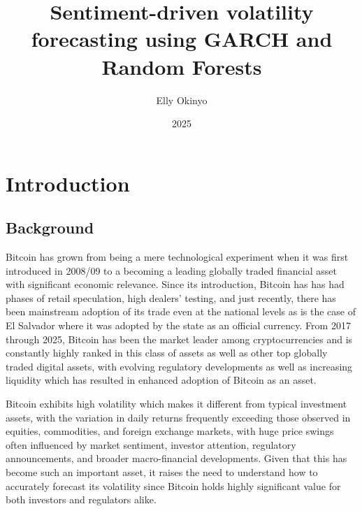\documentclass[12pt]{report}
\begin{document}
\Centering
\justifying

\title{Sentiment-driven volatility forecasting using GARCH and Random Forests}
\author{Elly Okinyo}
\date{2025}
\maketitle
\clearpage
{}    %
\setcounter{page}{1}     %
\tableofcontents
\newpage
\clearpage
{}   %
\setcounter{page}{1}     %
\chapter{Introduction}

\section{Background}

Bitcoin has grown from being a mere technological experiment when it was first introduced in 2008/09 to a becoming a leading globally traded financial asset with significant economic relevance. Since its introduction, Bitcoin has has had phases of retail speculation, high dealers' testing, and just recently, there has been mainstream adoption of its trade even at the national levels as is the case of El Salvador where it was adopted by the state as an official currency\citep{ArgenteVanPatten2024Bitcoin}. From 2017 through 2025, Bitcoin has been the market leader among cryptocurrencies and is constantly highly ranked in this class of assets as well as other top globally traded digital assets, with evolving regulatory developments as well as increasing liquidity which has resulted in enhanced adoption of Bitcoin as an asset.

Bitcoin exhibits high volatility which makes it different from typical investment assets, with the variation in daily returns frequently exceeding those observed in equities, commodities, and foreign exchange markets, with huge price swings often influenced by market sentiment, investor attention, regulatory announcements, and broader macro-financial developments. Given that this has become such an important asset, it raises the need to understand how to accurately forecast its volatility since Bitcoin holds highly significant value for both investors and regulators alike.
\end{document}
